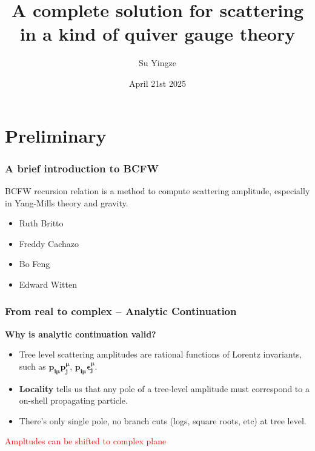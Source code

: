 \documentclass{beamer}
\title[Application of BCFW]{A complete solution for scattering in a kind of quiver gauge theory}
\author{Su Yingze}
\institute{Nagoya University}
\date[4 21st 2025]{April 21st 2025}
\begin{document}
\frame{\titlepage}
\section{Preliminary}
\begin{frame}
    \frametitle{A brief introduction to BCFW}
    BCFW recursion relation is a method to compute scattering amplitude, especially in Yang-Mills theory and gravity.
    \par
 \begin{itemize}[label=\textbullet]
    \item Ruth Britto
    \item Freddy Cachazo
    \item Bo Feng
    \item Edward Witten
 \end{itemize}
\end{frame}
\begin{frame}
    \frametitle{From real to complex -- Analytic Continuation}
    \textbf{Why is analytic continuation valid?}
\begin{itemize}
  \item Tree level scattering amplitudes are rational functions of Lorentz invariants, such as $\bm{p_{i\mu}p_j^\mu}$, $\bm{p_{i\mu}\epsilon_j^\mu}$.
  \item \textbf{Locality} tells us that any pole of a tree-level amplitude must correspond to a on-shell propagating particle. 
  \item There's only single pole, no branch cuts (logs, square roots, etc) at tree level.
\end{itemize}
    \begin{center}
    \end{center}
\vspace{0.5em}
\centering
\textcolor{red}{Ampltudes can be shifted to complex plane}
\end{frame}
\end{document}
